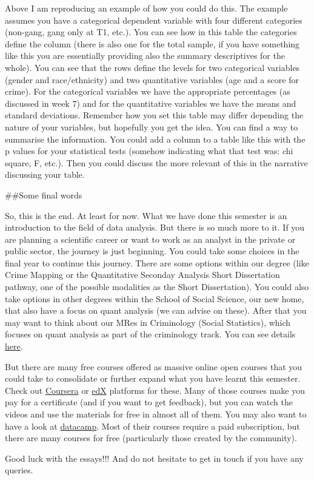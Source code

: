 \documentclass[
]{book}
\begin{document}
Above I am reproducing an example of how you could do this. The example assumes you have a categorical dependent variable with four different categories (non-gang, gang only at T1, etc.). You can see how in this table the categories define the column (there is also one for the total sample, if you have something like this you are essentially providing also the summary descriptives for the whole). You can see that the rows define the levels for two categorical variables (gender and race/ethnicity) and two quantitative variables (age and a score for crime). For the categorical variables we have the appropriate percentages (as discussed in week 7) and for the quantitative variables we have the means and standard deviations. Remember how you set this table may differ depending the nature of your variables, but hopefully you get the idea. You can find a way to summarise the information. You could add a column to a table like this with the p values for your statistical tests (somehow indicating what that test was: chi square, F, etc.). Then you could discuss the more relevant of this in the narrative discussing your table.

\#\#Some final words

So, this is the end. At least for now. What we have done this semester is an introduction to the field of data analysis. But there is so much more to it. If you are planning a scientific career or want to work as an analyst in the private or public sector, the journey is just beginning. You could take some choices in the final year to continue this journey. There are some options within our degree (like Crime Mapping or the Quantitative Seconday Analysis Short Dissertation pathway, one of the possible modalities as the Short Dissertation). You could also take options in other degrees within the School of Social Science, our new home, that also have a focus on quant analysis (we can advise on these). After that you may want to think about our MRes in Criminology (Social Statistics), which focuses on quant analysis as part of the criminology track. You can see details \href{https://www.manchester.ac.uk/study/masters/courses/list/10377/mres-criminology-social-statistics/}{here}.

But there are many free courses offered as massive online open courses that you could take to consolidate or further expand what you have learnt this semester. Check out \href{https://www.coursera.org/browse/data-science}{Coursera} or \href{https://www.edx.org/course/subject/data-science}{edX} platforms for these. Many of those courses make you pay for a certificate (and if you want to get feedback), but you can watch the videos and use the materials for free in almost all of them. You may also want to have a look at \href{https://www.datacamp.com}{datacamp}. Most of their courses require a paid subscription, but there are many courses for free (particularly those created by the community).

Good luck with the essays!!! And do not hesitate to get in touch if you have any queries.
\end{document}
